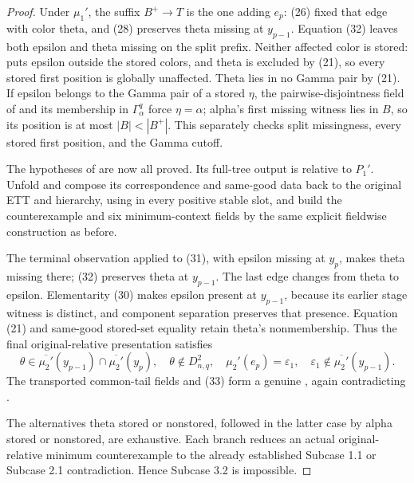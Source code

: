 \begin{proof}
Under \(\mu_1'\), the suffix \(B^+\to T\) is the one
 adding \(e_p\): (26) fixed that edge with
color theta, and (28) preserves theta missing at \(y_{p-1}\).  Equation
(32) leaves both epsilon and theta missing on the split prefix.  Neither
affected color is stored:  puts
epsilon outside the stored colors, and theta is excluded
by (21), so every stored first position is globally unaffected.  Theta
lies in no Gamma pair by (21).  If epsilon belongs to the Gamma pair of a
stored \(\eta\), the pairwise-disjointness field of
 and its membership in \(\Gamma^q_\alpha\) force
\(\eta=\alpha\); alpha's first missing witness
lies in \(B\), so its position is at most \(|B|<|B^+|\).  This separately
checks split missingness, every stored first position, and the Gamma cutoff.

The hypotheses of  are now all
proved.  Its full-tree output is relative to \(P_1'\).  Unfold
 and compose its correspondence
and same-good data back to the original ETT and hierarchy,
using  in every positive stable slot, and build the
counterexample and six minimum-context fields by the same explicit
fieldwise construction as before.

The terminal observation applied to (31), with epsilon missing at
\(y_p\), makes theta missing there; (32) preserves theta at
\(y_{p-1}\).  The last edge changes from theta to epsilon.  Elementarity
(30) makes epsilon present at \(y_{p-1}\), because its earlier stage
witness is distinct, and component separation preserves that presence.
Equation (21) and same-good stored-set equality retain theta's
nonmembership.  Thus the final original-relative presentation satisfies
\[
 \theta\in\overline{\mu_2'}(y_{p-1})\cap\overline{\mu_2'}(y_p),
 \quad\theta\notin D^2_{n,q},\quad
 \mu_2'(e_p)=\varepsilon_1,\quad
 \varepsilon_1\notin\overline{\mu_2'}(y_{p-1}).               \tag{33}
\]
The transported common-tail fields and (33) form a genuine
, again contradicting
.

The alternatives theta stored or nonstored, followed in the latter case
by alpha stored or nonstored, are exhaustive.  Each branch reduces an
actual original-relative minimum counterexample to the already established
Subcase 1.1 or Subcase 2.1 contradiction.  Hence Subcase 3.2 is impossible.
\end{proof}

